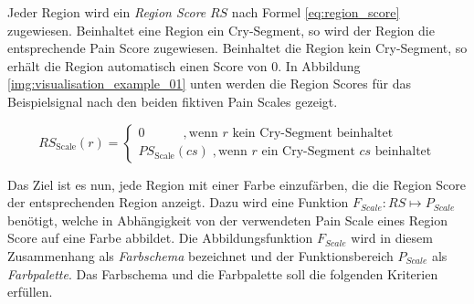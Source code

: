 Jeder Region wird ein \emph{Region Score} $RS$ nach Formel \ref{eq:region_score} zugewiesen. Beinhaltet eine Region ein Cry-Segment, so wird der Region die entsprechende Pain Score zugewiesen. Beinhaltet die Region kein Cry-Segment, so erhält die Region automatisch einen Score von 0. In Abbildung \ref{img:visualisation_example_01} unten werden die Region Scores für das Beispielsignal nach den beiden fiktiven Pain Scales gezeigt.

\begin{equation}
RS_{\text{Scale}}(r) = \begin{cases}
 0 \quad \quad \quad,  \text{wenn } r  \text{ kein Cry-Segment beinhaltet} \\
 PS_{\text{Scale}}(cs) \;, \text{wenn } r  \text{ ein Cry-Segment } cs \text{ beinhaltet}
 \end{cases}	
 \label{eq:region_score}
\end{equation}

Das Ziel ist es nun, jede Region mit einer Farbe einzufärben, die die Region Score der entsprechenden Region anzeigt. Dazu wird eine Funktion $F_{Scale}:RS \mapsto P_{Scale}$ benötigt, welche in Abhängigkeit von der verwendeten Pain Scale eines Region Score auf eine Farbe abbildet. Die Abbildungsfunktion $F_{Scale}$ wird in diesem Zusammenhang als \emph{Farbschema} bezeichnet und der Funktionsbereich $P_{Scale}$ als \emph{Farbpalette}. Das Farbschema und die Farbpalette soll die folgenden Kriterien erfüllen.

